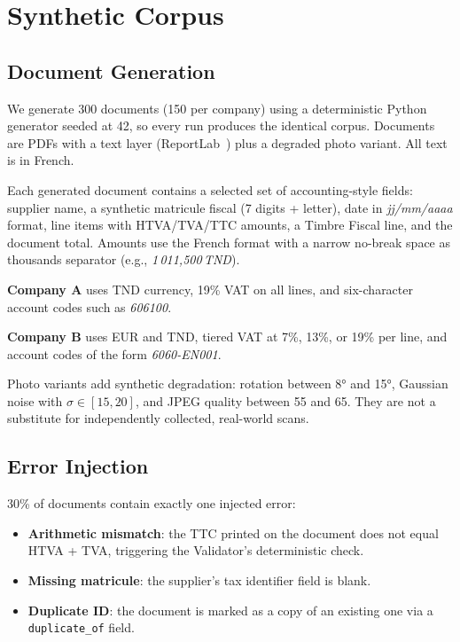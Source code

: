 \section{Synthetic Corpus}
\label{sec:data}

\subsection{Document Generation}

We generate 300 documents (150 per company) using a deterministic Python generator
seeded at 42, so every run produces the identical corpus. Documents are PDFs with
a text layer (ReportLab~\cite{reportlab}) plus a degraded photo variant.
All text is in French.

Each generated document contains a selected set of accounting-style fields:
supplier name, a synthetic matricule fiscal (7 digits + letter), date in
\textit{jj/mm/aaaa} format,
line items with HTVA/TVA/TTC amounts, a Timbre Fiscal line, and the document total.
Amounts use the French format with a narrow no-break space as thousands separator
(e.g., \textit{1\,011,500\,TND}).

\textbf{Company A} uses TND currency, 19\% VAT on all lines, and six-character
account codes such as \textit{606100}.

\textbf{Company B} uses EUR and TND, tiered VAT at 7\%, 13\%, or 19\% per line,
and account codes of the form \textit{6060-EN001}.

Photo variants add synthetic degradation: rotation between 8° and 15°,
Gaussian noise with $\sigma \in [15,20]$, and JPEG quality between 55 and 65.
They are not a substitute for independently collected, real-world scans.

\subsection{Error Injection}

30\% of documents contain exactly one injected error:

\begin{itemize}[leftmargin=*, itemsep=2pt]
  \item \textbf{Arithmetic mismatch}: the TTC printed on the document does not
        equal HTVA + TVA, triggering the Validator's deterministic check.
  \item \textbf{Missing matricule}: the supplier's tax identifier field is blank.
  \item \textbf{Duplicate ID}: the document is marked as a copy of an existing
        one via a \texttt{duplicate\_of} field.
\end{itemize}


